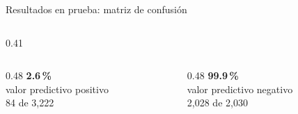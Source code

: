 \documentclass[aspectratio=169,10pt]{beamer}
\newcommand{\cifra}[1]{{\fontsize{24}{26}\selectfont\bfseries\color{azulfi}#1}}
\newcommand{\nota}[1]{{\footnotesize\color{black!65}#1}}
\begin{document}
\begin{frame}{Resultados en prueba: matriz de confusión}
\begin{columns}[c]
\begin{column}{0.41\textwidth}
\begin{columns}[c]
\begin{column}{0.48\textwidth}
          \cifra{2.6\,\%}\\ valor predictivo positivo\\ \nota{84 de 3,222}
        \end{column}
        \begin{column}{0.48\textwidth}\centering
          \cifra{99.9\,\%}\\ valor predictivo negativo\\ \nota{2,028 de 2,030}
        \end{column}
      \end{columns}
    \end{column}
  \end{columns}
\end{frame}

\end{document}
